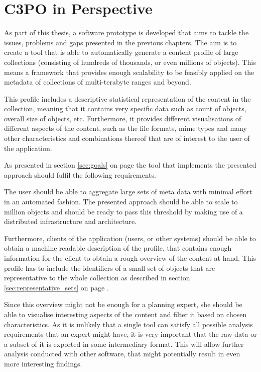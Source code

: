\section{C3PO in Perspective}
As part of this thesis, a software prototype is developed that aims to tackle the issues, problems and gaps presented in the previous chapters. The aim is to create a tool that is able to automatically generate a content profile of large collections (consisting of hundreds of thousands, or even millions of objects). This means a framework that provides enough scalability to be feasibly applied on the metadata of collections of multi-terabyte ranges and beyond.

This profile includes a descriptive statistical representation of the content in the collection, meaning that it contains very specific data such as count of objects, overall size of objects, etc. Furthermore, it provides different visualisations of different aspects of the content, such as the file formats, mime types and many other characteristics and combinations thereof that are of interest to the user of the application.

As presented in section \ref{sec:goals} on page \pageref{sec:goals} the tool that implements the presented approach should fulfil the following requirements.

The user should be able to aggregate large sets of meta data with minimal effort in an automated fashion. The presented approach should be able to scale to million objects and should be ready to pass this threshold by making use of a distributed infrastructure and architecture.

Furthermore, clients of the application (users, or other systems) should be able to obtain a machine readable description of the profile, that contains enough information for the client to obtain a rough overview of the content at hand. This profile has to include the identifiers of a small set of objects that are representative to the whole collection as described in section \ref{sec:representative_sets} on page \pageref{sec:representative_sets}.

Since this overview might not be enough for a planning expert, she should be able to visualise interesting aspects of the content and filter it based on chosen characteristics. As it is unlikely that a single tool can satisfy all possible analysis requirements that an expert might have, it is very important that the raw data or a subset of it is exported in some intermediary format. This will allow further analysis conducted with other software, that might potentially result in even more interesting findings. 

